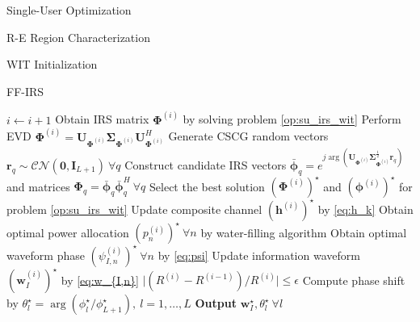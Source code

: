 \documentclass{IEEEtran}
\begin{document}
\begin{section}{Single-User Optimization}
\begin{subsection}{R-E Region Characterization}
\begin{subsubsection}{WIT Initialization}
\begin{paragraph}{FF-IRS}
\begin{algorithm}
\begin{algorithmic}[1]
						\Repeat
						\State $i \gets i + 1$
						\State Obtain IRS matrix $\boldsymbol{\Phi}^{(i)}$ by solving problem \ref{op:su_irs_wit}
						\State Perform EVD $\boldsymbol{\Phi}^{(i)}=\boldsymbol{U}_{\boldsymbol{\Phi}^{(i)}}\boldsymbol{\Sigma}_{\boldsymbol{\Phi}^{(i)}}\boldsymbol{U}_{\boldsymbol{\Phi}^{(i)}}^H$
						\State Generate CSCG random vectors $\boldsymbol{r}_q \sim \mathcal{CN}(\boldsymbol{0},\boldsymbol{I}_{L+1}) \ \forall q$
						\State Construct candidate IRS vectors $\bar{\boldsymbol{\phi}}_q=e^{j\arg\left(\boldsymbol{U}_{\boldsymbol{\Phi}^{(i)}}\boldsymbol{\Sigma}_{\boldsymbol{\Phi}^{(i)}}^{\frac{1}{2}}\boldsymbol{r}_q\right)}$ and matrices $\boldsymbol{\Phi}_q=\bar{\boldsymbol{\phi}}_q\bar{\boldsymbol{\phi}}_q^H  \ \forall q$
						\State Select the best solution $(\boldsymbol{\Phi}^{(i)})^\star$ and $(\boldsymbol{\phi}^{(i)})^\star$ for problem \ref{op:su_irs_wit}
						\State Update composite channel $(\boldsymbol{h}^{(i)})^\star$ by \ref{eq:h_k}
						\State Obtain optimal power allocation $(p_n^{(i)})^\star \ \forall n$ by water-filling algorithm
						\State Obtain optimal waveform phase $(\psi_{I,n}^{(i)})^\star \ \forall n$ by \ref{eq:psi}
						\State Update information waveform $(\boldsymbol{w}_I^{(i)})^\star$ by \ref{eq:w_{I,n}}
						\Until $\lvert (R^{(i)}-R^{(i-1)}) / R^{(i)} \rvert \le \epsilon$
						\State Compute phase shift by $\theta_l^\star=\arg(\phi_l^\star/\phi_{L+1}^\star), \ l=1,\dots,L$
						\State \textbf{Output} $\boldsymbol{w}_I^\star,\theta_l^\star \ \forall l$
					\end{algorithmic}
				\end{algorithm}
			\end{paragraph}
		\end{subsubsection}


\end{subsection}
\end{section}
\end{document}
